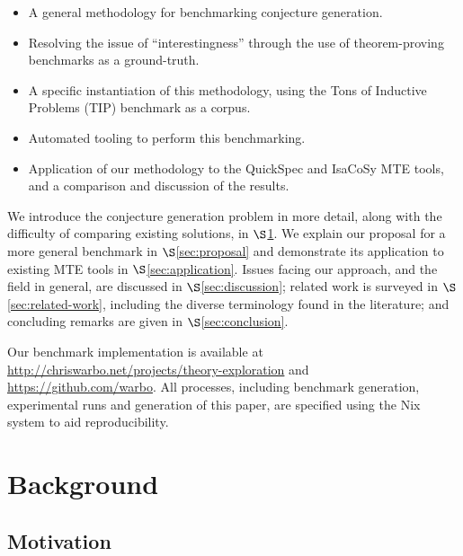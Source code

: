 \begin{itemize}
\item A general methodology for benchmarking conjecture generation.
\item Resolving the issue of ``interestingness'' through the use of
  theorem-proving benchmarks as a ground-truth.
\item A specific instantiation of this methodology, using the Tons of Inductive
  Problems (TIP) benchmark as a corpus.
\item Automated tooling to perform this benchmarking.
\item Application of our methodology to the QuickSpec and IsaCoSy MTE tools,
  and a comparison and discussion of the results.
\end{itemize}

We introduce the conjecture generation problem in more detail, along with the
difficulty of comparing existing solutions, in $\S$\ref{sec:background}. We
explain our proposal for a more general benchmark in $\S$\ref{sec:proposal} and
demonstrate its application to existing MTE tools in $\S$\ref{sec:application}.
Issues facing our approach, and the field in general, are discussed in
$\S$\ref{sec:discussion}; related work is surveyed in
$\S$\ref{sec:related-work}, including the diverse terminology found in the
literature; and concluding remarks are given in $\S$\ref{sec:conclusion}.

\begin{sloppypar}
  Our benchmark implementation is available at
  \url{http://chriswarbo.net/projects/theory-exploration} and
  \url{https://github.com/warbo}. All processes, including benchmark generation,
  experimental runs and generation of this paper, are specified using the
  Nix~\cite{dolstra2004nix} system to aid reproducibility.
\end{sloppypar}

\section{Background}
\label{sec:background}

\subsection{Motivation}
\label{sec:motivation}


